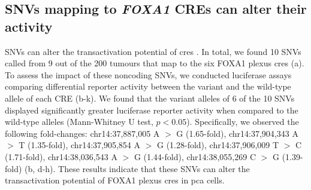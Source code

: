 \subsection{SNVs mapping to \emph{FOXA1} CREs can alter their activity}

SNVs can alter the transactivation potential of \glspl{cre} \cite{baileyNoncodingSomaticInherited2016,rheinbayRecurrentFunctionalRegulatory2017,zhangIntegrativeFunctionalGenomics2012,huangHighlyRecurrentTERT2013,hornTERTPromoterMutations2013,fuxmanbassHumanGeneCenteredTranscription2015,zhouEmergenceNoncodingCancer2016,feiginRecurrentNoncodingRegulatory2017,khuranaRoleNoncodingSequence2016,cowper-sal*lariBreastCancerRisk2012}.
In total, we found 10 SNVs called from 9 out of the 200 tumours that map to the six FOXA1 plexus \glspl{cre} (a).
To assess the impact of these noncoding SNVs, we conducted luciferase assays comparing differential reporter activity between the variant and the wild-type allele of each CRE (b-k).
We found that the variant alleles of 6 of the 10 SNVs displayed significantly greater luciferase reporter activity when compared to the wild-type alleles (Mann-Whitney U test, $p<0.05$).
Specifically, we observed the following fold-changes: chr14:37,887,005 A $>$ G (1.65-fold), chr14:37,904,343 A $>$ T (1.35-fold), chr14:37,905,854 A $>$ G (1.28-fold), chr14:37,906,009 T $>$ C (1.71-fold), chr14:38,036,543 A $>$ G (1.44-fold), chr14:38,055,269 C $>$ G (1.39-fold) (b, d-h).
These results indicate that these SNVs can alter the transactivation potential of FOXA1 plexus \glspl{cre} in \gls{pca} cells.


